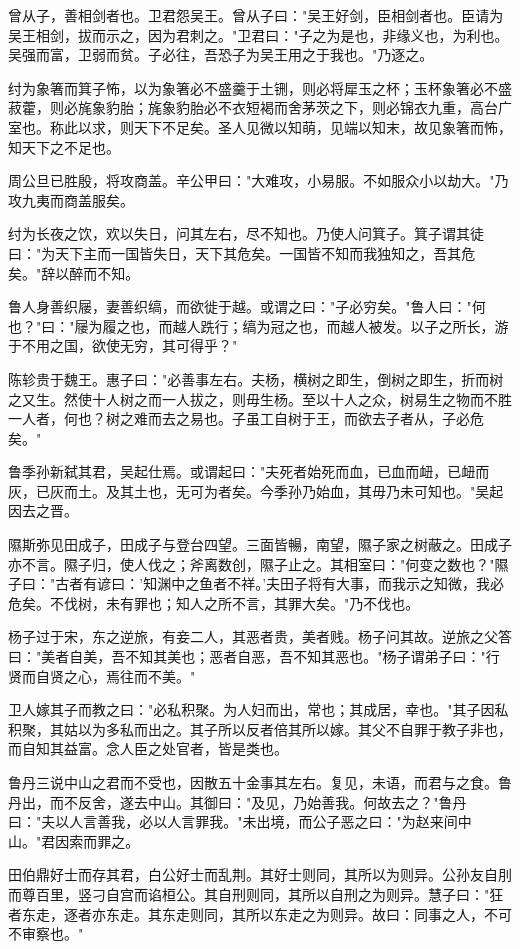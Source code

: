 \documentclass[]{article}
\begin{document}
曾从子，善相剑者也。卫君怨吴王。曾从子曰："吴王好剑，臣相剑者也。臣请为吴王相剑，拔而示之，因为君刺之。"卫君曰："子之为是也，非缘义也，为利也。吴强而富，卫弱而贫。子必往，吾恐子为吴王用之于我也。"乃逐之。

纣为象箸而箕子怖，以为象箸必不盛羹于土铏，则必将犀玉之杯；玉杯象箸必不盛菽藿，则必旄象豹胎；旄象豹胎必不衣短褐而舍茅茨之下，则必锦衣九重，高台广室也。称此以求，则天下不足矣。圣人见微以知萌，见端以知末，故见象箸而怖，知天下之不足也。

周公旦已胜殷，将攻商盖。辛公甲曰："大难攻，小易服。不如服众小以劫大。"乃攻九夷而商盖服矣。

纣为长夜之饮，欢以失日，问其左右，尽不知也。乃使人问箕子。箕子谓其徒曰："为天下主而一国皆失日，天下其危矣。一国皆不知而我独知之，吾其危矣。"辞以醉而不知。

鲁人身善织屦，妻善织缟，而欲徙于越。或谓之曰："子必穷矣。"鲁人曰："何也？"曰："屦为履之也，而越人跣行；缟为冠之也，而越人被发。以子之所长，游于不用之国，欲使无穷，其可得乎？"

陈轸贵于魏王。惠子曰："必善事左右。夫杨，横树之即生，倒树之即生，折而树之又生。然使十人树之而一人拔之，则毋生杨。至以十人之众，树易生之物而不胜一人者，何也？树之难而去之易也。子虽工自树于王，而欲去子者从，子必危矣。"

鲁季孙新弑其君，吴起仕焉。或谓起曰："夫死者始死而血，已血而衄，已衄而灰，已灰而土。及其土也，无可为者矣。今季孙乃始血，其毋乃未可知也。"吴起因去之晋。

隰斯弥见田成子，田成子与登台四望。三面皆暢，南望，隰子家之树蔽之。田成子亦不言。隰子归，使人伐之；斧离数创，隰子止之。其相室曰："何变之数也？"隰子曰："古者有谚曰：'知渊中之鱼者不祥。'夫田子将有大事，而我示之知微，我必危矣。不伐树，未有罪也；知人之所不言，其罪大矣。"乃不伐也。

杨子过于宋，东之逆旅，有妾二人，其恶者贵，美者贱。杨子问其故。逆旅之父答曰："美者自美，吾不知其美也；恶者自恶，吾不知其恶也。"杨子谓弟子曰："行贤而自贤之心，焉往而不美。"

卫人嫁其子而教之曰："必私积聚。为人妇而出，常也；其成居，幸也。"其子因私积聚，其姑以为多私而出之。其子所以反者倍其所以嫁。其父不自罪于教子非也，而自知其益富。念人臣之处官者，皆是类也。

鲁丹三说中山之君而不受也，因散五十金事其左右。复见，未语，而君与之食。鲁丹出，而不反舍，遂去中山。其御曰："及见，乃始善我。何故去之？"鲁丹曰："夫以人言善我，必以人言罪我。"未出境，而公子恶之曰："为赵来间中山。"君因索而罪之。

田伯鼎好士而存其君，白公好士而乱荆。其好士则同，其所以为则异。公孙友自刖而尊百里，竖刁自宫而谄桓公。其自刑则同，其所以自刑之为则异。慧子曰："狂者东走，逐者亦东走。其东走则同，其所以东走之为则异。故曰：同事之人，不可不审察也。"
\end{document}
